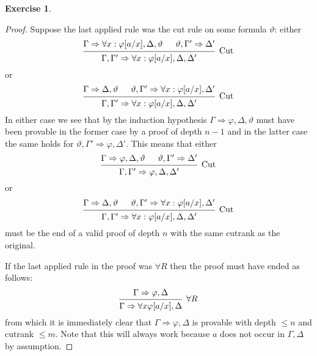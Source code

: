 \documentclass{article}
\newcommand{\sequent}[2]{#1\Rightarrow#2}
\theoremstyle{definition}
\newtheorem{question}{Exercise}
\begin{document}
\begin{question}
\begin{proof}
        Suppose the last applied rule was the cut rule on some formula
        \(\vartheta\): either
        \[
            \begin{prooftree}
                \hypo{\sequent{\Gamma}{\forall x:\varphi[a/x],\Delta},\vartheta}
                \hypo{\sequent{\vartheta,\Gamma'}{\Delta'}}
                \infer2[Cut]{\sequent{\Gamma,\Gamma'}{\forall x:\varphi[a/x],\Delta,\Delta'}}
            \end{prooftree}
        \]
        or
        \[
            \begin{prooftree}
                \hypo{\sequent{\Gamma}{\Delta,\vartheta}}
                \hypo{\sequent{\vartheta,\Gamma'}{\forall x:\varphi[a/x],\Delta'}}
                \infer2[Cut]{\sequent{\Gamma,\Gamma'}{\forall x:\varphi[a/x],\Delta,\Delta'}}
            \end{prooftree}
        \]
        In either case we see that by the induction hypothesis
        \(\sequent{\Gamma}{\varphi,\Delta},\vartheta\) must have been provable
        in the former case by a proof of depth \(n-1\) and in the latter case
        the same holds for \(\sequent{\vartheta,\Gamma'}{\varphi,\Delta'}\).
        This means that either
        \[
            \begin{prooftree}
                \hypo{\sequent{\Gamma}{\varphi,\Delta},\vartheta}
                \hypo{\sequent{\vartheta,\Gamma'}{\Delta'}}
                \infer2[Cut]{\sequent{\Gamma,\Gamma'}{\varphi,\Delta,\Delta'}}
            \end{prooftree}
        \]
        or
        \[
            \begin{prooftree}
                \hypo{\sequent{\Gamma}{\Delta,\vartheta}}
                \hypo{\sequent{\vartheta,\Gamma'}{\forall x:\varphi[a/x],\Delta'}}
                \infer2[Cut]{\sequent{\Gamma,\Gamma'}{\forall x:\varphi[a/x],\Delta,\Delta'}}
            \end{prooftree}
        \]
        must be the end of a valid proof of depth \(n\) with the same cutrank as
        the original.

        If the last applied rule in the proof was \(\forall R\) then the proof
        must have ended as follows:
        \[
            \begin{prooftree}
                \hypo{\sequent{\Gamma}{\varphi,\Delta}}
                \infer1[\(\forall R\)]{\sequent{\Gamma}{\forall x\varphi[a/x],\Delta}}
            \end{prooftree}
        \]
        from which it is immediately clear that
        \(\sequent{\Gamma}{\varphi,\Delta}\) is provable with depth \(\leq n\)
        and cutrank \(\leq m\). Note that this will always work because \(a\)
        does not occur in \(\Gamma,\Delta\) by assumption.


\end{proof}
\end{question}
\end{document}
